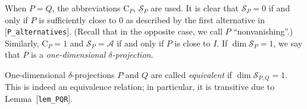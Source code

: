 \hypertarget{def:one-dimensional-delta-projection}{}%
\begin{definition}\label{def:one-dimensional-delta-projection}
When $P=Q$, the abbreviations $\mathrm{C}_{P}$, $\mathcal{S}_P$ are used. It is clear that $\mathcal{S}_P=0$ if and only if $P$ is sufficiently close to $0$ as described by the first alternative in \textup{[\texttt{P\_alternatives}]}. (Recall that in the opposite case, we call $P$ ``nonvanishing''.) Similarly, $\mathrm{C}_P=1$ and $\mathcal{S}_P=\mathcal{A}$ if and only if $P$ is close to $I$. If $\dim\mathcal{S}_P=1$, we say that $P$ is a \emph{one-dimensional $\delta$-projection}.

One-dimensional $\delta$-projections $P$ and $Q$ are called \emph{equivalent} if $\dim\mathcal{S}_{P,Q}=1$. This is indeed an equivalence relation; in particular, it is transitive due to Lemma~\textup{[\texttt{lem\_PQR}]}.
\end{definition}
